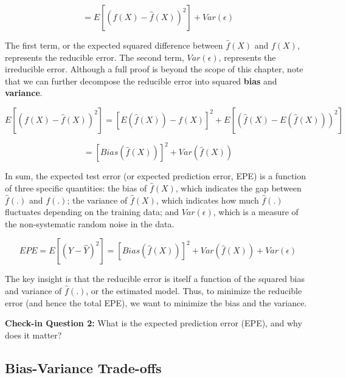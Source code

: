 \documentclass{book}
\begin{document}
\[=E \left[  \left( f \left( X \right) -\hat{f} \left( X \right)  \right) ^{2} \right] +Var \left(  \epsilon  \right)\]

The first term, or the expected squared difference between \(\hat{f}(X)\) and
\({f}(X)\), represents the reducible error. The second term,
\(Var(\epsilon)\), represents the irreducible error. Although a full proof is
beyond the scope of this chapter, note that we can further decompose the
reducible error into squared \textbf{bias} and \textbf{variance}.

\[E \left[  \left( f \left( X \right) -\hat{f} \left( X \right)  \right) ^{2} \right] = \left[ E \left( \hat{f} \left( X \right)  \right) -f \left( X \right)  \right] ^{2}+E \left[  \left( \hat{f} \left( X \right) -E \left( \hat{f} \left( X \right)  \right)  \right) ^{2} \right]\]

\[= \left[ Bias \left( \hat{f} \left( X \right)  \right)  \right] ^{2}+Var \left( \hat{f} \left( X \right)  \right)\]

In sum, the expected test error (or expected prediction error, EPE) is a
function of three specific quantities: the bias of \(\hat{f}(X)\), which
indicates the gap between \(\hat{f}(.)\) and \(f(.)\); the variance of
\(\hat{f}(X)\), which indicates how much \(\hat{f}(.)\) fluctuates depending
on the training data; and \(Var(\epsilon)\), which is a measure of the
non-systematic random noise in the data.

\[EPE=E \left[  \left( Y-\hat{Y} \right) ^{2} \right] = \left[ Bias \left( \hat{f} \left( X \right)  \right)  \right] ^{2}+Var \left( \hat{f} \left( X \right)  \right) +Var \left(  \epsilon  \right)\]

The key insight is that the reducible error is itself a function of the
squared bias and variance of \(\hat{f}(.)\), or the estimated model. Thus, to
minimize the reducible error (and hence the total EPE), we want to minimize
the bias and the variance.

\textbf{Check-in Question 2:} What is the expected prediction error (EPE), and
why does it matter?

\hypertarget{bias-variance-trade-offs}{%
\subsection{Bias-Variance Trade-offs}\label{bias-variance-trade-offs}}
\end{document}
